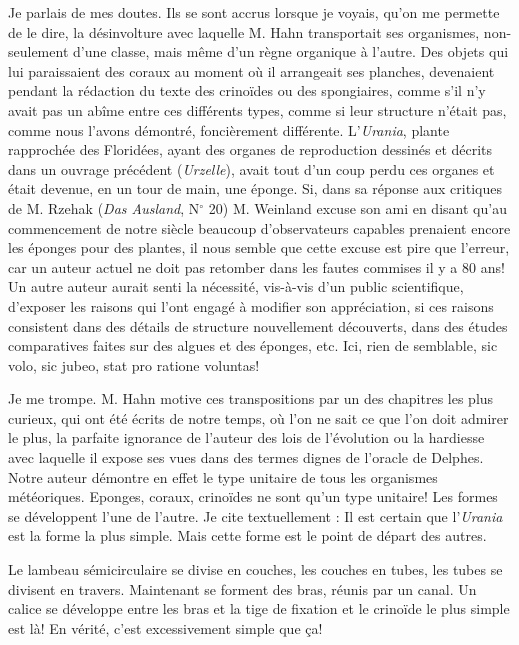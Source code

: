 \documentclass[a4paper, 12pt, oneside, french]{article}
\begin{document}
Je parlais de mes doutes. Ils se sont accrus lorsque je voyais, qu'on me permette de le dire, la désinvolture avec laquelle M. Hahn transportait ses organismes, non-seulement d'une classe, mais même d'un règne organique à l'autre. Des objets qui lui paraissaient des coraux au moment où il arrangeait ses planches, devenaient pendant la rédaction du texte des crinoïdes ou des spongiaires, comme s'il n'y avait pas un abîme entre ces différents types, comme si leur structure n'était pas, comme nous l'avons démontré, foncièrement différente. L'\emph{Urania}, plante rapprochée des Floridées, ayant des organes de reproduction dessinés et décrits dans un ouvrage précédent (\emph{Urzelle}), avait tout d'un coup perdu ces organes et était devenue, en un tour de main, une éponge. Si, dans sa réponse aux critiques de M. Rzehak (\emph{Das Ausland}, N$^{\circ}$ 20) M. Weinland excuse son ami en disant \og qu'au commencement de notre siècle \og beaucoup d'observateurs capables prenaient encore les éponges pour des plantes, \fg il nous semble que cette excuse est pire que l'erreur, car un auteur actuel ne doit pas retomber dans les fautes commises il y a 80 ans! Un autre auteur aurait senti la nécessité, vis-à-vis d'un public scientifique, d'exposer les raisons qui l'ont engagé à modifier son appréciation, si ces raisons consistent dans des détails de structure nouvellement découverts, dans des études comparatives faites sur des algues et des éponges, etc. Ici, rien de semblable, sic volo, sic jubeo, stat pro ratione voluntas!

Je me trompe. M. Hahn motive ces transpositions par un des chapitres les plus curieux, qui ont été écrits de notre temps, où l'on ne sait ce que l'on doit admirer le plus, la parfaite ignorance de l'auteur des lois de l'évolution ou la hardiesse avec laquelle il expose ses vues dans des termes dignes de l'oracle de Delphes. Notre auteur démontre en effet \og le type unitaire de tous les organismes météoriques. \fg Eponges, coraux, crinoïdes ne sont qu'un type unitaire! Les formes se développent l'une de l'autre. Je cite textuellement : \og Il est certain que l'\emph{Urania} est la forme la plus simple. Mais cette forme est le point de départ des autres. \fg

\og Le lambeau sémicirculaire se divise en couches, les couches en tubes, les tubes se divisent en travers. Maintenant se forment des bras, réunis par un canal. Un calice se développe entre les bras et la tige de fixation et le crinoïde le plus simple est là! \fg En vérité, c'est excessivement simple que ça!
\end{document}
